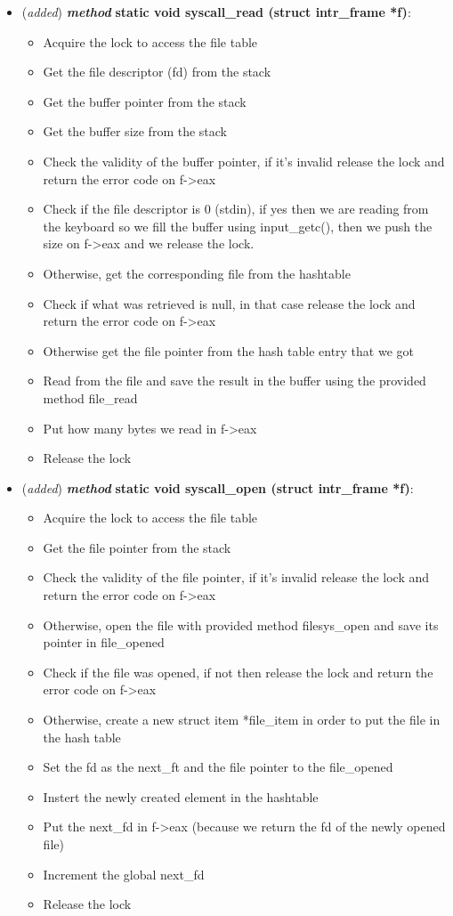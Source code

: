 \documentclass[11pt]{scrartcl}
\begin{document}
\begin{itemize}
    \item (\textit{added}) \textbf{\textit{method}} \textbf{static void
syscall\_read (struct intr\_frame *f)}: 
\begin{itemize}
    \item[] Acquire the lock to access the file table 
    \item[] Get the file descriptor (fd) from the stack
    \item[] Get the buffer pointer from the stack
    \item[] Get the buffer size from the stack
    \item[] Check the validity of the buffer pointer, if it's invalid release the lock and return the error code on f->eax
    \item[] Check if the file descriptor is 0 (stdin), if yes then we are reading from the keyboard so we fill the buffer using input\_getc(), then we push the size on f->eax and we release the lock.
        \item[] Otherwise, get the corresponding file from the hashtable
    \item[] Check if what was retrieved is null, in that case release the lock and return the error code on f->eax
    \item[] Otherwise get the file pointer from the hash table entry that we got
    \item[] Read from the file and save the result in the buffer using the provided method file\_read
    \item[] Put how many bytes we read in f->eax
    \item[] Release the lock
\end{itemize}


    \item (\textit{added}) \textbf{\textit{method}} \textbf{static void
syscall\_open (struct intr\_frame *f)}:
\begin{itemize}
    \item[] Acquire the lock to access the file table 
    \item[] Get the file pointer from the stack
    \item[] Check the validity of the file pointer, if it's invalid release the lock and return the error code on f->eax
    \item[] Otherwise, open the file with provided method filesys\_open and save its pointer in file\_opened
    \item[] Check if the file was opened, if not then release the lock and return the error code on f->eax
    \item[] Otherwise, create a new struct item *file\_item in order to put the file in the hash table
    \item[] Set the fd as the next\_ft and the file pointer to the file\_opened
    \item[] Instert the newly created element in the hashtable
    \item[] Put the next\_fd in f->eax (because we return the fd of the newly opened file)
    \item[] Increment the global next\_fd
    \item[] Release the lock
\end{itemize}
    
\end{itemize}
\end{document}
